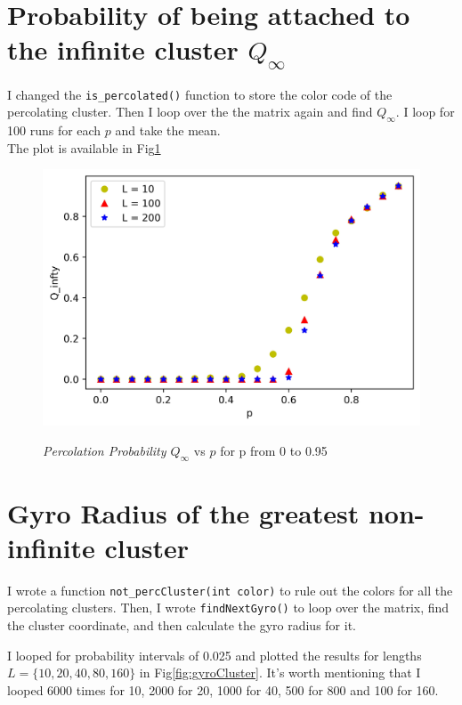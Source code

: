 \documentclass[12pt]{article}
\begin{document}
	\section{Probability of being attached to the infinite cluster $Q_\infty$}
	I changed the \texttt{is\_percolated()} function to store the color code of the percolating cluster. Then I 
	loop over the the matrix again and find $Q_\infty$. I loop for 100 runs for each $p$ and take the mean.\\
	The plot is available in Fig\ref{fig:percProb}
	\begin{figure}[h!]
		\includegraphics[width=0.9\linewidth]{../p4/percProb.jpg}
		\label{fig:percProb}
		\caption{\emph{Percolation Probability $Q_\infty$} vs \emph{$p$} for p from 0 to 0.95}
	\end{figure}
	
	\section{Gyro Radius of the greatest non-infinite cluster}
	I wrote a function \texttt{not\_percCluster(int color)} to rule out the colors for all the percolating clusters. Then, I wrote \texttt{findNextGyro()} to loop over the matrix, find the cluster coordinate, and then calculate the gyro radius for it.
	
	I looped for probability intervals of 0.025 and plotted the results for lengths $L = \{10, 20, 40, 80, 160\}$ in 
	Fig\ref{fig:gyroCluster}. It's worth mentioning that I looped 6000 times for 10, 2000 for 20, 1000 for 40, 500 for 800 and 100 for 160.
	
\end{document}
